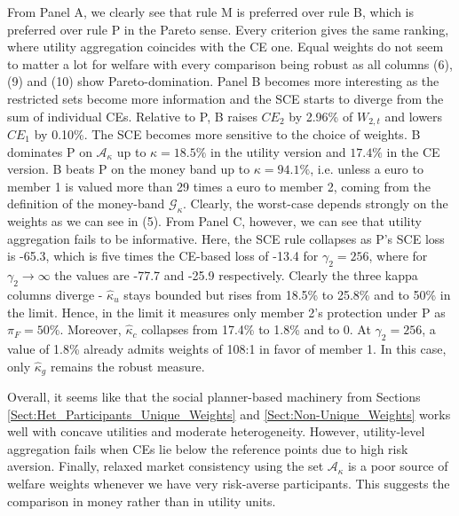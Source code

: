 \documentclass[11pt,a4paper]{article}
\theoremstyle{definition}
\theoremstyle{plain}
\theoremstyle{remark}
\newcommand{\1}{\mathbf{1}}
\begin{document}
From Panel A, we clearly see that rule M is preferred over rule B, which is preferred over rule P in the Pareto sense. Every criterion gives the same ranking, where utility aggregation coincides with the CE one. Equal weights do not seem to matter a lot for welfare with every comparison being robust as all columns (6), (9) and (10) show Pareto-domination. Panel B becomes more interesting as the restricted sets become more information and the SCE starts to diverge from the sum of individual CEs. Relative to P, B raises $CE_2$ by 2.96\% of $W_{2,t}$ and lowers $CE_1$ by 0.10\%. The SCE becomes more sensitive to the choice of weights. B dominates P on $\mathcal{A}_{\kappa}$ up to $\kappa = 18.5\%$ in the utility version and $17.4\%$ in the CE version. B beats P on the money band up to $\kappa=94.1\%$, i.e. unless a euro to member 1 is valued more than 29 times a euro to member 2, coming from the definition of the money-band $\mathcal{G}_\kappa$. Clearly, the worst-case depends strongly on the weights as we can see in (5). From Panel C, however, we can see that utility aggregation fails to be informative. Here, the SCE rule collapses as P's SCE loss is -65.3, which is five times the CE-based loss of -13.4 for $\gamma_2 = 256$, where for $\gamma_2 \to \infty$ the values are -77.7 and -25.9 respectively. Clearly the three kappa columns diverge - $\hat{\kappa}_u$ stays bounded but rises from 18.5\% to 25.8\% and to 50\% in the limit. Hence, in the limit it measures only member 2's protection under P as $\pi_F = 50\%$. Moreover, $\hat{\kappa}_c$ collapses from 17.4\% to 1.8\% and to 0. At $\gamma_2 = 256$, a value of 1.8\% already admits weights of 108:1 in favor of member 1. In this case, only $\hat{\kappa}_g$ remains the robust measure.

Overall, it seems like that the social planner-based machinery from Sections \ref{Sect:Het_Participants_Unique_Weights} and \ref{Sect:Non-Unique_Weights} works well with concave utilities and moderate heterogeneity. However, utility-level aggregation fails when CEs lie below the reference points due to high risk aversion. Finally, relaxed market consistency using the set $\mathcal{A}_\kappa$ is a poor source of welfare weights whenever we have very risk-averse participants. This suggests the comparison in money rather than in utility units.
\end{document}
